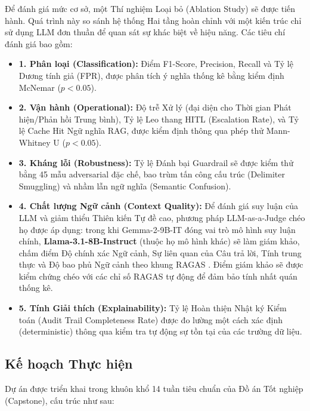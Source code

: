 \documentclass[12pt,a4paper]{article}
\begin{document}
Để đánh giá mức cơ sở, một Thí nghiệm Loại bỏ (Ablation Study) sẽ được tiến hành. Quá trình này so sánh hệ thống Hai tầng hoàn chỉnh với một kiến trúc chỉ sử dụng LLM đơn thuần để quan sát sự khác biệt về hiệu năng.
Các tiêu chí đánh giá bao gồm:
\begin{itemize}
    \item \textbf{1. Phân loại (Classification):} Điểm F1-Score, Precision, Recall và Tỷ lệ Dương tính giả (FPR), được phân tích ý nghĩa thống kê bằng kiểm định McNemar ($p<0.05$).
    \item \textbf{2. Vận hành (Operational):} Độ trễ Xử lý (đại diện cho Thời gian Phát hiện/Phản hồi Trung bình), Tỷ lệ Leo thang HITL (Escalation Rate), và Tỷ lệ Cache Hit Ngữ nghĩa RAG, được kiểm định thông qua phép thử Mann-Whitney U ($p<0.05$).
    \item \textbf{3. Kháng lỗi (Robustness):} Tỷ lệ Đánh bại Guardrail sẽ được kiểm thử bằng 45 mẫu adversarial đặc chế, bao trùm tấn công cấu trúc (Delimiter Smuggling) và nhầm lẫn ngữ nghĩa (Semantic Confusion).
    \item \textbf{4. Chất lượng Ngữ cảnh (Context Quality):} Để đánh giá suy luận của LLM và giảm thiểu Thiên kiến Tự đề cao, phương pháp LLM-as-a-Judge chéo họ được áp dụng: trong khi Gemma-2-9B-IT đóng vai trò mô hình suy luận chính, \textbf{Llama-3.1-8B-Instruct} (thuộc họ mô hình khác) sẽ làm giám khảo, chấm điểm Độ chính xác Ngữ cảnh, Sự liên quan của Câu trả lời, Tính trung thực và Độ bao phủ Ngữ cảnh theo khung RAGAS \cite{ragas2023}. Điểm giám khảo sẽ được kiểm chứng chéo với các chỉ số RAGAS tự động để đảm bảo tính nhất quán thống kê.
    \item \textbf{5. Tính Giải thích (Explainability):} Tỷ lệ Hoàn thiện Nhật ký Kiểm toán (Audit Trail Completeness Rate) được đo lường một cách xác định (deterministic) thông qua kiểm tra tự động sự tồn tại của các trường dữ liệu.
\end{itemize}

\subsection{Kế hoạch Thực hiện}
Dự án được triển khai trong khuôn khổ 14 tuần tiêu chuẩn của Đồ án Tốt nghiệp (Capstone), cấu trúc như sau:
\end{document}
